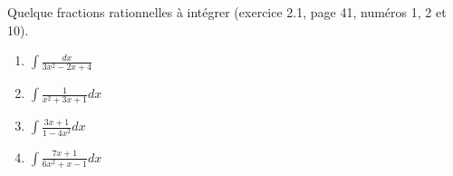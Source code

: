 \begin{exercice}\label{exoGeneral0018}

Quelque fractions rationnelles à intégrer (exercice 2.1, page 41, numéros 1, 2 et 10). 
\begin{enumerate}

\item
$\int \frac{ dx }{ 3x^2-2x+4 }$
\item
$\int \frac{ 1 }{ x^2+3x+1 } dx$
\item
$\int \frac{ 3x+1 }{ 1-4x^2 } dx$
\item
$\int \frac{ 7x+1 }{ 6x^2+x-1 } dx$

\end{enumerate}


\end{exercice}
